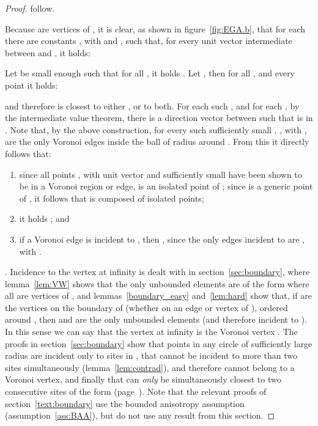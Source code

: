 \documentclass[11pt]{article}
\begin{document}
\begin{proof}
follow. 

Because  are vertices of , 
	it is clear, as shown in figure~\ref{fig:EGA.b}, 
	that for each  there are constants , with  and , 
	such that, for every unit vector  intermediate between  and , 
it holds:
	
Let  be small enough such that for all , 
	it holds . 
Let , 
	then for all , 
	and every point  it holds:
	
	and therefore  is closest to either , or to both. 
For each such , and for each  , 
	by the intermediate value theorem, 
	there is a direction vector  between  such that  
	is in . Note that, by the above construction, for every such sufficiently small , 
	, with , are the only Voronoi edges inside the ball of radius  around . 
From this it directly follows that: 
\begin{enumerate}
	\item since all points , with unit vector  and sufficiently small  
			have been shown to be in a Voronoi region or edge, 
			 is an isolated point of ;
		since  is a generic point of , it follows that  is composed of isolated points;
	\item it holds ; and 
	\item if a Voronoi edge  is incident to , then , 
		since the only edges incident to  are , with . 
\end{enumerate}


\vspace*{0.1in}. 
Incidence to the vertex at infinity is dealt with in section~\ref{sec:boundary}, 
	where lemma~\ref{lem:VW} shows that the only unbounded elements 
	are of the form  where all  are vertices of , 
and lemmas~\ref{boundary_easy} and~\ref{lem:hard} show that, 
	if  are the vertices on the boundary of  (whether on an edge or vertex of ), 
	ordered around , 
	then  and  are the only unbounded elements
	(and therefore incident to ). 
In this sense we can say that the vertex at infinity  is the Voronoi vertex . 
The proofs in section~\ref{sec:boundary} show that points  in any circle of sufficiently large radius are incident 
	only to sites in , 
	that  cannot be incident to more than two sites simultaneously (lemma~\ref{lem:contrad}), 
	and therefore  cannot belong to a Voronoi vertex, 
	and finally that  can \emph{only} be simultaneously closest to two consecutive sites of the form 
	(page~\pageref{text:boundary}). 
Note that the relevant proofs of section~\ref{text:boundary} use the bounded anisotropy assumption (assumption~\ref{ass:BAA}), 
	but do not use any result from this section. 
\end{proof}
\end{document}
